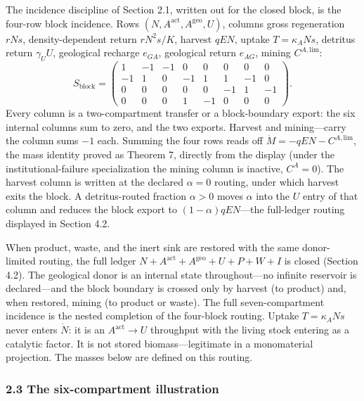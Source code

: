 \documentclass[11pt]{article}
\begin{document}
The incidence discipline of Section 2.1, written out for the closed block, is the four-row block incidence. Rows \((N, A^{\mathrm{act}}, A^{\mathrm{geo}}, U)\), columns gross regeneration \(rNs\), density-dependent return \(rN^2 s/\allowbreak{}K\), harvest \(qEN\), uptake \(T = \kappa_A N s\), detritus return \(\gamma_U U\), geological recharge \(e_{GA}\), geological return \(e_{AG}\), mining \(C^{A,\mathrm{lim}}\): \[S_{\mathrm{block}} =
\begin{pmatrix}
1 & -1 & -1 & 0 & 0 & 0 & 0 & 0 \\
-1 & 1 & 0 & -1 & 1 & 1 & -1 & 0 \\
0 & 0 & 0 & 0 & 0 & -1 & 1 & -1 \\
0 & 0 & 0 & 1 & -1 & 0 & 0 & 0
\end{pmatrix}.\] Every column is a two-compartment transfer or a block-boundary export: the six internal columns sum to zero, and the two exports. Harvest and mining---carry the column sums \(-1\) each. Summing the four rows reads off \(\dot M = -qEN - C^{A,\mathrm{lim}}\), the mass identity proved as Theorem 7, directly from the display (under the institutional-failure specialization the mining column is inactive, \(C^A = 0\)). The harvest column is written at the declared \(\alpha = 0\) routing, under which harvest exits the block. A detritus-routed fraction \(\alpha > 0\) moves \(\alpha\) into the \(U\) entry of that column and reduces the block export to \((1-\alpha)qEN\)---the full-ledger routing displayed in Section 4.2.

When product, waste, and the inert sink are restored with the same donor-limited routing, the full ledger \(N + A^{\mathrm{act}} + A^{\mathrm{geo}} + U + P + W + I\) is closed (Section 4.2). The geological donor is an internal state throughout---no infinite reservoir is declared---and the block boundary is crossed only by harvest (to product) and, when restored, mining (to product or waste). The full seven-compartment incidence is the nested completion of the four-block routing. Uptake \(T = \kappa_A N s\) never enters \(\dot N\): it is an \(A^{\mathrm{act}} \to U\) throughput with the living stock entering as a catalytic factor. It is not stored biomass---legitimate in a monomaterial projection. The masses below are defined on this routing.

\subsubsection{2.3 The six-compartment
illustration}\label{the-six-compartment-illustration}
\end{document}
